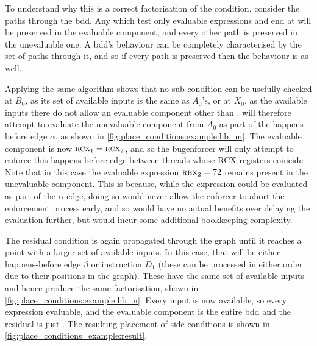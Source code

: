 To understand why this is a correct factorisation of the condition,
consider the paths through the \gls{bdd}.  Any which test only
evaluable expressions and end at {\false} will be preserved in the
evaluable component, and every other path is preserved in the
unevaluable one.  A \gls{bdd}'s behaviour can be completely
characterised by the set of paths through it, and so if every path is
preserved then the behaviour is as well.

Applying the same algorithm shows that no sub-condition can be
usefully checked at $B_0$, as its set of available inputs is the same
as $A_0$'s, or at $X_0$, as the available inputs there do not allow an
evaluable component other than \true.  {\Technique} will therefore
attempt to evaluate the unevaluable component from $A_0$ as part of
the happens-before edge $\alpha$, as shown in
\autoref{fig:place_conditions:example:hb_m}.  The evaluable component
is now $\textsc{rcx}_1 = \textsc{rcx}_2$, and so the \gls{bugenforcer}
will only attempt to enforce this happens-before edge between threads
whose RCX registers coincide.  Note that in this case the evaluable
expression $\textsc{rbx}_2 = 72$ remains present in the unevaluable
component.  This is because, while the expression could be evaluated
as part of the $\alpha$ edge, doing so would never allow the enforcer
to abort the enforcement process early, and so would have no actual
benefits over delaying the evaluation further, but would incur some
additional bookkeeping complexity.

The residual condition is again propagated through the graph until it
reaches a point with a larger set of available inputs.  In this case,
that will be either happens-before edge $\beta$ or instruction $D_1$
(these can be processed in either order due to their positions in the
graph).  These have the same set of available inputs and hence produce
the same factorisation, shown in
\autoref{fig:place_conditions:example:hb_n}.  Every input is now
available, so every expression evaluable, and the evaluable component
is the entire \gls{bdd} and the residual is just {\true}.  The
resulting placement of side conditions is shown in
\autoref{fig:place_conditions_example:result}.

